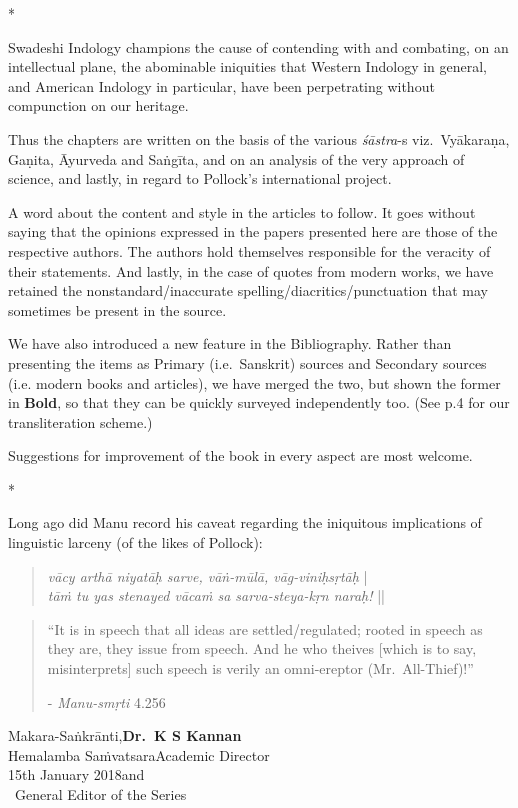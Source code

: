\centerline{*\quad*\quad*}
\vskip 5pt


Swadeshi Indology champions the cause of contending with and combating, on an intellectual plane, the abominable iniquities that Western Indology in general, and American Indology in particular, have been perpetrating without compunction on our heritage.

\newpage

Thus the chapters are written on the basis of the various {\sl śāstra}-s viz.\ Vyākaraṇa, Gaṇita, Āyurveda and Saṅgīta, and on an analysis of the very approach of science, and lastly, in regard to Pollock's international project.

A word about the content and style in the articles to follow. It goes without saying that the opinions expressed in the papers presented here are those of the respective authors. The authors hold themselves responsible for the veracity of their statements. And lastly, in the case of quotes from modern works, we have retained the nonstandard/inaccurate spelling/diacritics/punctuation that may sometimes be present in the source.

We have also introduced a new feature in the Bibliography. Rather than presenting the items as Primary (i.e.\ Sanskrit) sources and Secondary sources (i.e. modern books and articles), we have merged the two, but shown the former in {\bf Bold}, so that they can be quickly surveyed independently too. (See p.4 for 
our transliteration scheme.)

Suggestions for improvement of the book in every aspect are most welcome.
\vskip 10pt

\centerline{*\quad*\quad*}
\vskip 5pt


Long ago did Manu record his caveat regarding the iniquitous implications of linguistic larceny (of the likes of Pollock):

\begin{quote}
{{\sl vācy arthā niyatāḥ sarve, vāṅ-mūlā, vāg-viniḥsṛtāḥ}} |\\
{\sl tāṁ tu yas stenayed vācaṁ sa sarva-steya-kṛn naraḥ!} ||
\end{quote}

\begin{quote}
“It is in speech that all ideas are settled/regulated; rooted in speech as they are, they issue from speech. And he who theives [which is to say, misinterprets] such speech is verily an omni-ereptor (Mr.\ All-Thief)!”

\hfill	- {\sl Manu-smṛti} 4.256
\end{quote}
\bigskip

\noindent
Makara-Saṅkrānti,\hfill	{\bf Dr.~K S Kannan}\\
Hemalamba Saṁvatsara\hfill Academic Director\\
15th January 2018\hfill and\\	
\phantom{.}~\hfill General Editor of the Series
